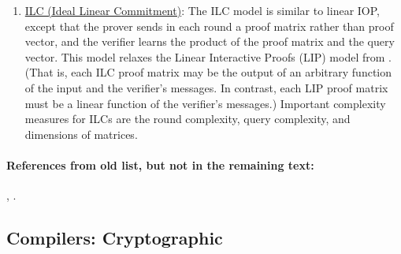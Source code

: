 \begin{enumerate}[label=\alph*.]
	\item{} \underline{ILC (Ideal Linear Commitment)}: 
	The ILC model is similar to linear IOP, except that the prover sends in each round a proof matrix rather than proof vector, and the verifier learns the product of the proof matrix and the query vector. 
	This model relaxes the Linear Interactive Proofs (LIP) model from \cite{2013:tcc:snargs-via-LIPs}. 
	(That is, each ILC proof matrix may be the output of an arbitrary function of the input and the verifier’s messages. In contrast, each LIP proof matrix must be a linear function of the verifier’s messages.) 
	Important complexity measures for ILCs are the round complexity, query complexity, and dimensions of matrices.
	
	\end{enumerate}



\paragraph{References from old list, but not in the remaining text:}
\cite{2018:asiacrypt:arya-nearly-linear-time-zkps-for-correct},
\cite{2010:asiacrypt:short-NIZKPs}.


\subsection{Compilers: Cryptographic}
\label{paradigms:taxonomy:compilers-crypto} 
	

